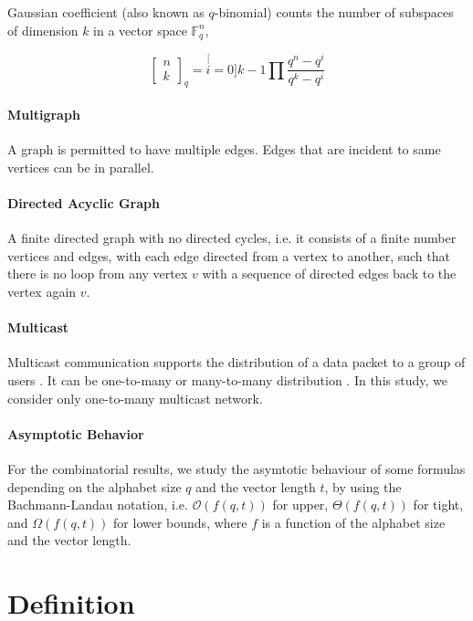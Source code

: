 Gaussian coefficient (also known as $q$-binomial) counts the number
of subspaces of dimension $k$ in a vector space $\ensuremath{\mathbb{F}}_{q}^{n}$,

\[
\left[\begin{array}{c}
n\\
k
\end{array}\right]_{q}=\stackrel[i=0]{k-1}{\prod}\frac{q^{n}-q^{i}}{q^{k}-q^{i}}
\]


\paragraph{Multigraph}

A graph is permitted to have multiple edges. Edges that are incident
to same vertices can be in parallel. 

\paragraph{Directed Acyclic Graph}

A finite directed graph with no directed cycles, i.e. it consists
of a finite number vertices and edges, with each edge directed from
a vertex to another, such that there is no loop from any vertex $v$
with a sequence of directed edges back to the vertex again $v$.

\paragraph{Multicast}

Multicast communication supports the distribution of a data packet
to a group of users \cite{Zhang:2012}. It can be one-to-many or many-to-many
distribution \cite{Harte:2008}. In this study, we consider only one-to-many
multicast network.

\paragraph{Asymptotic Behavior}

For the combinatorial results, we study the asymtotic behaviour of
some formulas depending on the alphabet size $q$ and the vector length
$t$, by using the Bachmann-Landau notation, i.e. $\mathcal{O}\left(f\left(q,t\right)\right)$
for upper, $\Theta\left(f\left(q,t\right)\right)$ for tight, and
$\Omega\left(f\left(q,t\right)\right)$ for lower bounds, where $f$
is a function of the alphabet size and the vector length.

\section{Definition}

